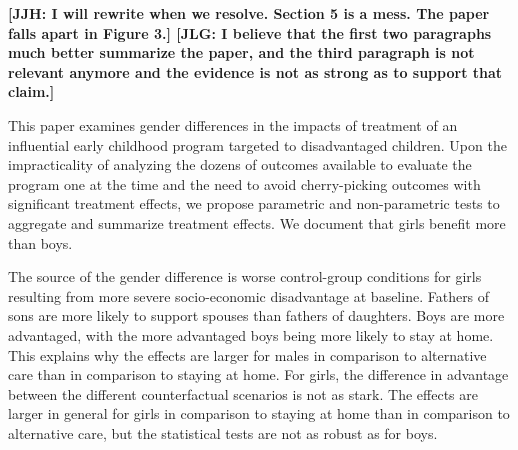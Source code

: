\textbf{[JJH: I will rewrite when we resolve. Section 5 is a mess. The paper falls apart in Figure 3.] [JLG: I believe that the first two paragraphs much better summarize the paper, and the third paragraph is not relevant anymore and the evidence is not as strong as to support that claim.]}

This paper examines gender differences in the impacts of treatment of an influential early childhood program targeted to disadvantaged children. Upon the impracticality of analyzing the dozens of outcomes available to evaluate the program one at the time and the need to avoid cherry-picking outcomes with significant treatment effects, we propose parametric and non-parametric tests to aggregate and summarize treatment effects. We document that girls benefit more than boys. 

The source of the gender difference is worse control-group conditions for girls resulting from more severe socio-economic disadvantage at baseline. Fathers of sons are more likely to support spouses than fathers of daughters. Boys are more advantaged, with the more advantaged boys being more likely to stay at home. This explains why the effects are larger for males in comparison to alternative care than in comparison to staying at home. For girls, the difference in advantage between the different counterfactual scenarios is not as stark. The effects are larger in general for girls in comparison to staying at home than in comparison to alternative care, but the statistical tests are not as robust as for boys.